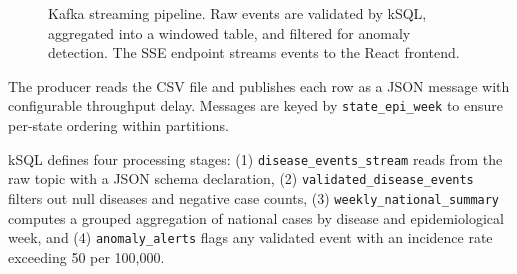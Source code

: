 \documentclass[12pt,a4paper]{article}
\begin{document}
\begin{figure}[H]
\centering
{}
\caption{Kafka streaming pipeline. Raw events are validated by kSQL, aggregated into a windowed table, and filtered for anomaly detection. The SSE endpoint streams events to the React frontend.}
\label{fig:kafka_pipeline}
\end{figure}

The producer reads the CSV file and publishes each row as a JSON message with configurable throughput delay. Messages are keyed by \texttt{state\_epi\_week} to ensure per-state ordering within partitions.

kSQL defines four processing stages: (1) \texttt{disease\_events\_stream} reads from the raw topic with a JSON schema declaration, (2) \texttt{validated\_disease\_events} filters out null diseases and negative case counts, (3) \texttt{weekly\_national\_summary} computes a grouped aggregation of national cases by disease and epidemiological week, and (4) \texttt{anomaly\_alerts} flags any validated event with an incidence rate exceeding 50 per 100,000.
\end{document}
